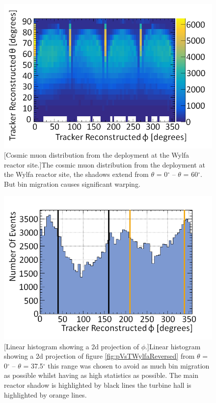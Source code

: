 \begin{figure}[!h]
\centering
\begin{minipage}{.45\textwidth}
  \centering
  \includegraphics[width=\linewidth]{Chapter6/Figs/Raster/pVsTWylfaReversedMedText.png}
  [Cosmic muon distribution from the deployment at the Wylfa reactor site.]{The cosmic muon distribution from the deployment at the Wylfa reactor site, the shadows extend from $\theta$ = 0$^\circ$ -- $\theta$ = 60$^\circ$. But bin migration causes significant warping.}
  \label{fig:pVsTWylfaReversed}
  \vspace{1.434cm} %
\end{minipage}%
\qquad
\begin{minipage}{.45\textwidth}
  \centering
  \includegraphics[width=\linewidth]{Chapter6/Figs/Raster/LinearHist_theta_0-37.5_DegMedText.png}
  [Linear histogram showing a 2d projection of $\phi$.]{Linear histogram showing a 2d projection of figure \ref{fig:pVsTWylfaReversed} from $\theta$ = 0$^\circ$ -- $\theta$ = 37.5$^\circ$ this range was chosen to avoid as much bin migration as possible whilst having as high statistics as possible. The main reactor shadow is highlighted by black lines the turbine hall is highlighted by orange lines.}
  \label{fig:LinearHist_theta_0-37.5_Deg}
\end{minipage}
\end{figure}

